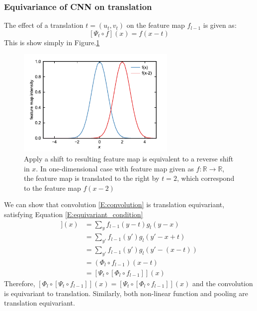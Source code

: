 \documentclass{IEEEtran}
\begin{document}
\subsubsection*{Equivariance of CNN on translation}
The effect of a translation $t = (u_t,v_t)$ on the feature map $f_{l-1}$ is given as:
\begin{equation}
    \label{E:translation_on_featuremap}
    [\Psi_t \circ f] (x) = f(x-t)
\end{equation}
This is show simply in Figure.\ref{F:3dnn_shift}
\begin{figure}[h]
    \centering
    \includegraphics[width=3in]{figures/3dnn_shift.pdf}
    \caption{Apply a shift to resulting feature map is equivalent to a reverse shift in $x$. 
                In one-dimensional case with feature map given as $f\colon \mathbb{R} \to \mathbb{R}$,
                the feature map is translated to the right by $t = 2$, which correspond to the feature map $f(x-2)$}
    \label{F:3dnn_shift}
\end{figure}

We can show that convolution \eqref{E:convolution} is translation equivariant, 
satisfying Equation \eqref{E:equivariant_condition}
\begin{align*}
    [\Phi_l \circ [\Psi_t \circ f_{l-1}]] (x) &= \sum_y f_{l-1}(y-t) g_l(y-x) \\
    &= \sum_{y'} f_{l-1}(y') g_l(y'-x+t) \\
    &= \sum_{y'} f_{l-1}(y') g_l(y'-(x-t)) \\
    &= (\Phi_l \circ f_{l-1}) (x-t) \\ &= [\Psi_t \circ [\Phi_l \circ f_{l-1}]] (x)
\end{align*}
Therefore, $[\Phi_l \circ [\Psi_t \circ f_{l-1}]] (x) = [\Psi_t \circ [\Phi_l \circ f_{l-1}]] (x)$ and the convolution
is equivariant to translation. Similarly, both non-linear function and pooling are translation equivariant.
\end{document}
